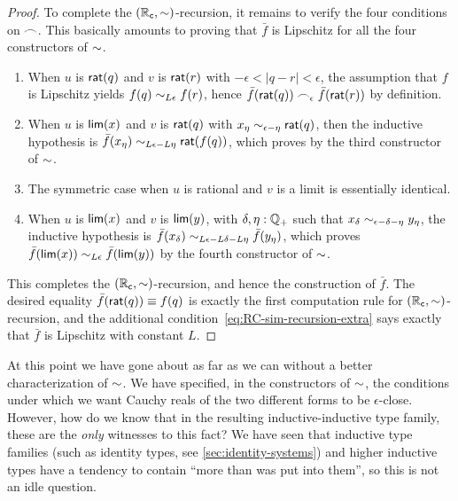 \begin{proof}
  To complete the $(\mathbb{R}_\mathsf{c},\mathord\sim)$-recursion, it remains to verify the four conditions on $\frown$.
  This basically amounts to proving that $\bar f$ is Lipschitz for all the four constructors of $\mathord\sim$.
  \begin{enumerate}
  \item When $u$ is $\mathsf{rat}(q)$ and $v$ is $\mathsf{rat}(r)$ with $-\epsilon < |q-r| <\epsilon$, the assumption that $f$ is Lipschitz yields $f(q) \sim_{L\epsilon} f(r)$, hence $\bar{f}(\mathsf{rat}(q)) \frown_\epsilon \bar{f}(\mathsf{rat}(r))$ by definition.
  \item When $u$ is $\mathsf{lim}(x)$ and $v$ is $\mathsf{rat}(q)$ with $x_\eta \sim_{\epsilon - \eta} \mathsf{rat}(q)$, then the
      inductive hypothesis is $\bar{f}(x_\eta) \sim_{L \epsilon - L \eta} \mathsf{rat}(f(q))$, which proves
      by the third constructor of $\mathord\sim$.
  \item The symmetric case when $u$ is rational and $v$ is a limit is essentially identical.
  \item When $u$ is $\mathsf{lim}(x)$ and $v$ is $\mathsf{lim}(y)$, with $\delta, \eta : \mathbb{Q}_{+}$ such that $x_\delta \sim_{\epsilon - \delta - \eta} y_\eta$,
      the inductive hypothesis is $\bar{f}(x_\delta) \sim_{L \epsilon - L \delta - L \eta} \bar{f}(y_\eta)$, which proves $\bar{f}(\mathsf{lim}(x)) \sim_{L
        \epsilon} \bar{f}(\mathsf{lim}(y))$ by the fourth constructor of $\mathord\sim$.
  \end{enumerate}
  This completes the $(\mathbb{R}_\mathsf{c},\mathord\sim)$-recursion, and hence the construction of $\bar f$.
  The desired equality $\bar f(\mathsf{rat}(q))\equiv f(q)$ is exactly the first computation rule for $(\mathbb{R}_\mathsf{c},\mathord\sim)$-recursion, and the additional condition~\eqref{eq:RC-sim-recursion-extra} says exactly that $\bar f$ is Lipschitz with constant $L$.
\end{proof}

At this point we have gone about as far as we can without a better characterization of $\mathord\sim$.
We have specified, in the constructors of $\mathord\sim$, the conditions under which we want Cauchy reals of the two different forms to be $\epsilon$-close.
However, how do we know that in the resulting inductive-inductive type family, these are the \emph{only} witnesses to this fact?
We have seen that inductive type families (such as identity types, see \cref{sec:identity-systems}) and higher inductive types have a tendency to contain ``more than was put into them'', so this is not an idle question.

